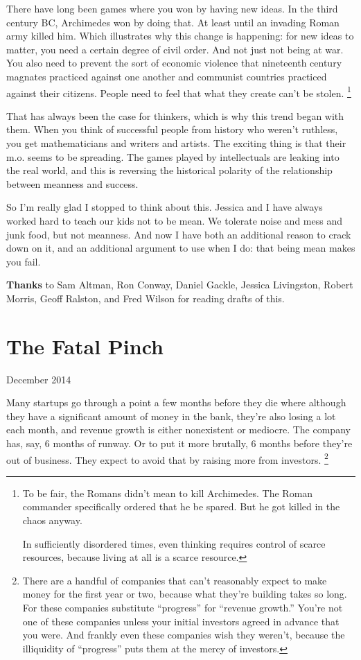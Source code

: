 \documentclass[12pt]{book}
\begin{document}
There have long been games where you won by having new ideas. In the
third century BC, Archimedes won by doing that. At least until an
invading Roman army killed him. Which illustrates why this change is
happening: for new ideas to matter, you need a certain degree of civil
order. And not just not being at war. You also need to prevent the sort
of economic violence that nineteenth century magnates practiced against
one another and communist countries practiced against their citizens.
People need to feel that what they create can't be stolen.
\footnote{To be fair, the Romans didn't mean to kill Archimedes. The Roman
commander specifically ordered that he be spared. But he got killed in
the chaos anyway.

In sufficiently disordered times, even thinking requires control of
scarce resources, because living at all is a scarce resource.}

That has always been the case for thinkers, which is why this trend
began with them. When you think of successful people from history who
weren't ruthless, you get mathematicians and writers and artists. The
exciting thing is that their m.o. seems to be spreading. The games
played by intellectuals are leaking into the real world, and this is
reversing the historical polarity of the relationship between meanness
and success.

So I'm really glad I stopped to think about this. Jessica and I have
always worked hard to teach our kids not to be mean. We tolerate noise
and mess and junk food, but not meanness. And now I have both an
additional reason to crack down on it, and an additional argument to use
when I do: that being mean makes you fail.


\textbf{Thanks} to Sam Altman, Ron Conway, Daniel Gackle, Jessica
Livingston, Robert Morris, Geoff Ralston, and Fred Wilson for reading
drafts of this.
\chapter{The Fatal Pinch}

December 2014

Many startups go through a point a few months before they die where
although they have a significant amount of money in the bank, they're
also losing a lot each month, and revenue growth is either nonexistent
or mediocre. The company has, say, 6 months of runway. Or to put it more
brutally, 6 months before they're out of business. They expect to avoid
that by raising more from investors. \footnote{There are a handful of companies that can't reasonably expect to
make money for the first year or two, because what they're building
takes so long. For these companies substitute ``progress'' for ``revenue
growth.'' You're not one of these companies unless your initial
investors agreed in advance that you were. And frankly even these
companies wish they weren't, because the illiquidity of ``progress''
puts them at the mercy of investors.}
\end{document}
